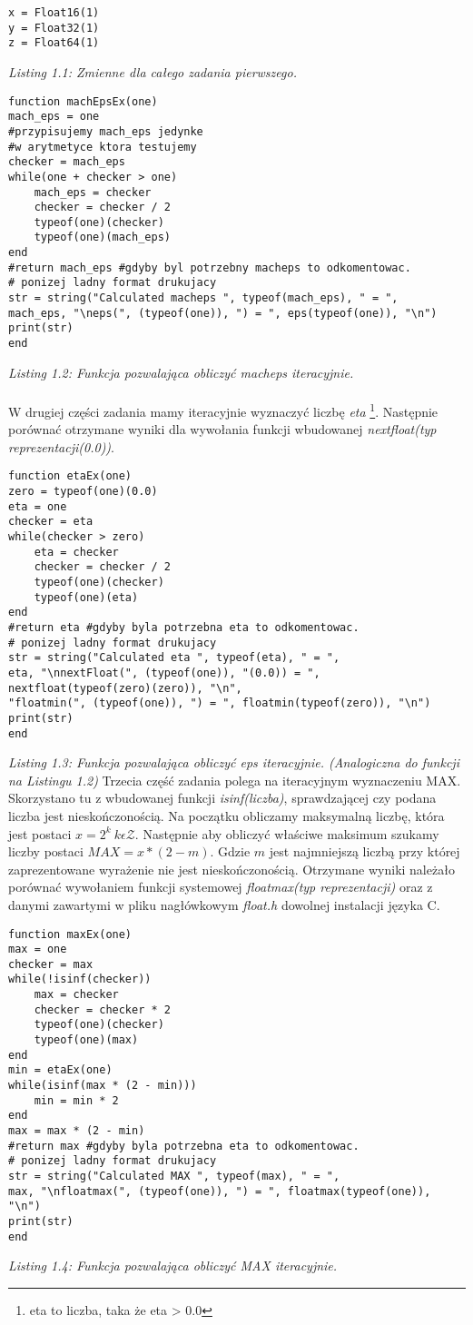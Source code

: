 \documentclass[]{article}
\begin{document}
\begin{lstlisting}
x = Float16(1)
y = Float32(1)
z = Float64(1)
\end{lstlisting}
\textit{Listing 1.1: Zmienne dla całego zadania pierwszego.}
\newpage
\begin{lstlisting}
function machEpsEx(one)
mach_eps = one	
#przypisujemy mach_eps jedynke 
#w arytmetyce ktora testujemy
checker = mach_eps
while(one + checker > one)
	mach_eps = checker
	checker = checker / 2
	typeof(one)(checker)
	typeof(one)(mach_eps)
end
#return mach_eps #gdyby byl potrzebny macheps to odkomentowac.
# ponizej ladny format drukujacy
str = string("Calculated macheps ", typeof(mach_eps), " = ",
mach_eps, "\neps(", (typeof(one)), ") = ", eps(typeof(one)), "\n")
print(str)
end
\end{lstlisting}
\textit{Listing 1.2: Funkcja pozwalająca obliczyć macheps iteracyjnie.}
\\\\
W drugiej części zadania mamy iteracyjnie wyznaczyć liczbę \textit{eta} \footnote{eta to liczba, taka że eta > 0.0}. Następnie porównać otrzymane wyniki dla wywołania funkcji wbudowanej \textit{nextfloat(typ reprezentacji(0.0))}. 
\begin{lstlisting}
function etaEx(one)
zero = typeof(one)(0.0)
eta = one
checker = eta
while(checker > zero)
	eta = checker
	checker = checker / 2
	typeof(one)(checker)
	typeof(one)(eta)
end
#return eta #gdyby byla potrzebna eta to odkomentowac.
# ponizej ladny format drukujacy
str = string("Calculated eta ", typeof(eta), " = ",
eta, "\nnextFloat(", (typeof(one)), "(0.0)) = ", nextfloat(typeof(zero)(zero)), "\n",
"floatmin(", (typeof(one)), ") = ", floatmin(typeof(zero)), "\n")
print(str)
end
\end{lstlisting}
\textit{Listing 1.3: Funkcja pozwalająca obliczyć eps iteracyjnie. (Analogiczna do funkcji na Listingu 1.2)}
\newpage 
Trzecia część zadania polega na iteracyjnym wyznaczeniu MAX. Skorzystano tu z wbudowanej funkcji \textit{isinf(liczba)}, sprawdzającej czy podana liczba jest nieskończonością. Na początku obliczamy maksymalną liczbę, która jest postaci \(x = 2^k \: k\epsilon \mathcal{Z}\). Następnie aby obliczyć właściwe maksimum szukamy liczby postaci \(MAX = x * (2 - m)\). Gdzie \(m\) jest najmniejszą liczbą przy której zaprezentowane wyrażenie nie jest nieskończonością. Otrzymane wyniki należało porównać wywołaniem funkcji systemowej \textit{floatmax(typ reprezentacji)} oraz z danymi zawartymi w pliku nagłówkowym \textit{float.h} dowolnej instalacji języka C. 
\begin{lstlisting}
function maxEx(one)
max = one
checker = max
while(!isinf(checker))
	max = checker
	checker = checker * 2
	typeof(one)(checker)
	typeof(one)(max)
end
min = etaEx(one)
while(isinf(max * (2 - min)))
	min = min * 2    
end
max = max * (2 - min)
#return max #gdyby byla potrzebna eta to odkomentowac.
# ponizej ladny format drukujacy
str = string("Calculated MAX ", typeof(max), " = ",
max, "\nfloatmax(", (typeof(one)), ") = ", floatmax(typeof(one)), "\n")
print(str)
end
\end{lstlisting}
\textit{Listing 1.4: Funkcja pozwalająca obliczyć MAX iteracyjnie.}
\end{document}

